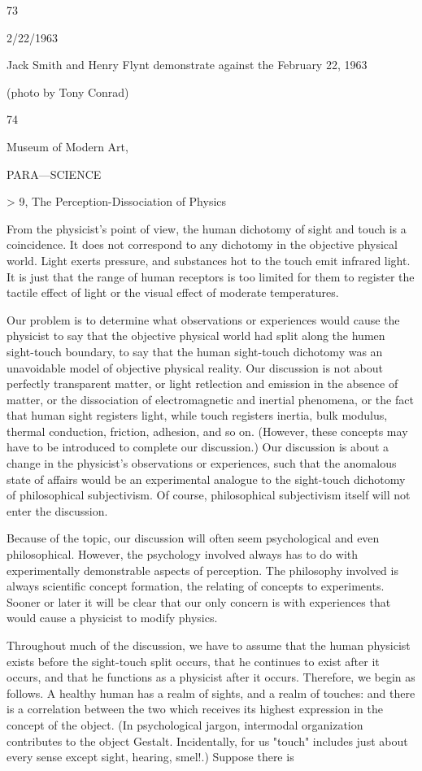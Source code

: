 \documentclass[10pt,twoside]{memoir}
\begin{document}
\begin{enumerate}
{{{{{{{{{{{{{{{73 


2/22/1963 


Jack Smith and Henry Flynt demonstrate against the 
February 22, 1963 


(photo by Tony Conrad) 


74 


Museum of Modern Art, 


PARA—SCIENCE 


> 9, The Perception-Dissociation of Physics 


From the physicist's point of view, the human dichotomy of sight and 
touch is a coincidence. It does not correspond to any dichotomy in the 
objective physical world. Light exerts pressure, and substances hot to the 
touch emit infrared light. It is just that the range of human receptors is too 
limited for them to register the tactile effect of light or the visual effect of 
moderate temperatures. 

Our problem is to determine what observations or experiences would 
cause the physicist to say that the objective physical world had split along 
the humen sight-touch boundary, to say that the human sight-touch 
dichotomy was an unavoidable model of objective physical reality. Our 
discussion is not about perfectly transparent matter, or light retlection and 
emission in the absence of matter, or the dissociation of electromagnetic and 
inertial phenomena, or the fact that human sight registers light, while touch 
registers inertia, bulk modulus, thermal conduction, friction, adhesion, and 
so on. (However, these concepts may have to be introduced to complete our 
discussion.) Our discussion is about a change in the physicist's observations 
or experiences, such that the anomalous state of affairs would be an 
experimental analogue to the sight-touch dichotomy of philosophical 
subjectivism. Of course, philosophical subjectivism itself will not enter the 
discussion. 

Because of the topic, our discussion will often seem psychological and 
even philosophical. However, the psychology involved always has to do with 
experimentally demonstrable aspects of perception. The philosophy involved 
is always scientific concept formation, the relating of concepts to 
experiments. Sooner or later it will be clear that our only concern is with 
experiences that would cause a physicist to modify physics. 

Throughout much of the discussion, we have to assume that the human 
physicist exists before the sight-touch split occurs, that he continues to exist 
after it occurs, and that he functions as a physicist after it occurs. Therefore, 
we begin as follows. A healthy human has a realm of sights, and a realm of 
touches: and there is a correlation between the two which receives its highest 
expression in the concept of the object. (In psychological jargon, intermodal 
organization contributes to the object Gestalt. Incidentally, for us "touch" 
includes just about every sense except sight, hearing, smel!.) Suppose there is 


}}}}}}}}}}}}}}}
\end{enumerate}
\end{document}

